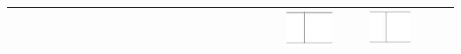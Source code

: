 \documentclass[10pt]{article}
\begin{document}
\begin{center}
\begin{tabular}{|c|c|c|c|c|c|c|c|c|c|c|c|c|c|c|c|c|c|c|c|c|c|c|c|c|c|c|c|c|}
 &  &  &  &  &  &  &  &  &  &  &  &  &  &  &  &  &  &  &  &  &  & \includegraphics[max width=\textwidth]{2024_11_21_f1ecc00f5c4ab21f0d04g-16(1)}
 &  &  & \includegraphics[max width=\textwidth]{2024_11_21_f1ecc00f5c4ab21f0d04g-16}
 &  &  &  \\
\hline
\end{tabular}
\end{center}
\end{document}
